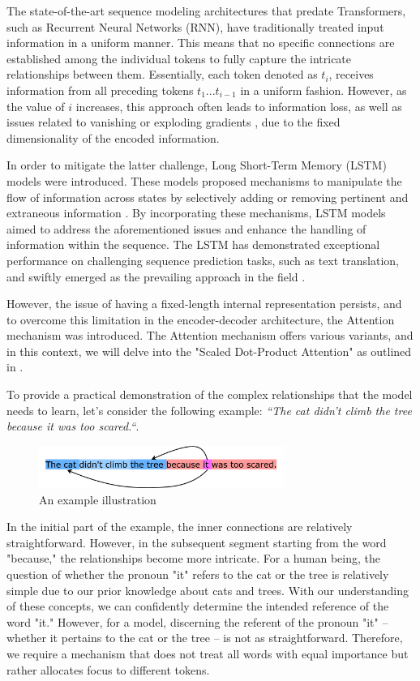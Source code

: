The state-of-the-art sequence modeling architectures that predate Transformers, such as Recurrent Neural Networks (RNN), have traditionally treated input information in a uniform manner. This means that no specific connections are established among the individual tokens to fully capture the intricate relationships between them. Essentially, each token denoted as $t_i$, receives information from all preceding tokens $t_1...t_{i-1}$ in a uniform fashion. However, as the value of $i$ increases, this approach often leads to information loss, as well as issues related to vanishing or exploding gradients \cite{hochreiter1997long}, due to the fixed dimensionality of the encoded information.

In order to mitigate the latter challenge, Long Short-Term Memory (LSTM) models were introduced. These models proposed mechanisms to manipulate the flow of information across states by selectively adding or removing pertinent and extraneous information \cite{hochreiter1997long}. By incorporating these mechanisms, LSTM models aimed to address the aforementioned issues and enhance the handling of information within the sequence.
The LSTM has demonstrated exceptional performance on challenging sequence prediction tasks, such as text translation, and swiftly emerged as the prevailing approach in the field \cite{cho2014learning, sutskever2014sequence}.

However, the issue of having a fixed-length internal representation persists, and to overcome this limitation in the encoder-decoder architecture, the Attention mechanism was introduced. The Attention mechanism offers various variants, and in this context, we will delve into the "Scaled Dot-Product Attention" as outlined in \cite{vaswani2017attention}.

To provide a practical demonstration of the complex relationships that the model needs to learn, let's consider the following example: \emph{``The cat didn't climb the tree because it was too scared.``}.
\begin{figure}[h]
    \centering
    \includegraphics[width=8cm]{pages/imgs/example.png}
    \caption{An example illustration}
    \label{fig:example}
\end{figure}
In the initial part of the example, the inner connections are relatively straightforward. However, in the subsequent segment starting from the word "because," the relationships become more intricate.
For a human being, the question of whether the pronoun "it" refers to the cat or the tree is relatively simple due to our prior knowledge about cats and trees. With our understanding of these concepts, we can confidently determine the intended reference of the word "it." 
However, for a model, discerning the referent of the pronoun "it" -- whether it pertains to the cat or the tree -- is not as straightforward. Therefore, we require a mechanism that does not treat all words with equal importance but rather allocates focus to different tokens.

